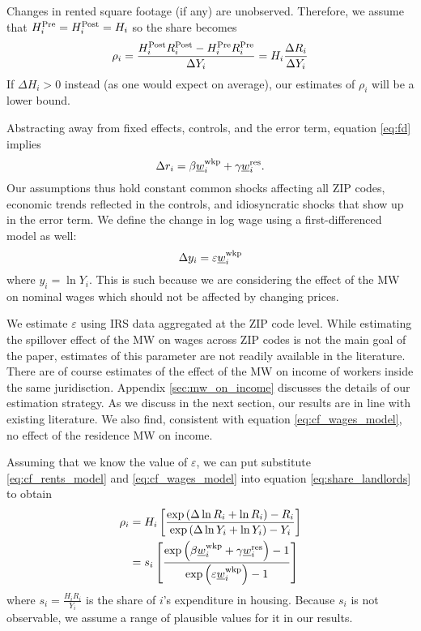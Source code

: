 Changes in rented square footage (if any) are unobserved.
Therefore, we assume that
$H^{\text{Pre}}_i = H^{\text{Post}}_i = H_i$ 
so the share becomes
\begin{equation}\label{eq:share_landlords}
    \rho_i = \frac{H^{\text{Post}}_i R^{\text{Post}}_i - H^{\text{Pre}}_i R^{\text{Pre}}_i}{\Delta Y_i} = 
                H_i \frac{\Delta R_i}{\Delta Y_i}
\end{equation}
If $\Delta H_i > 0$ instead (as one would expect on average), 
our estimates of $\rho_i$ will be a lower bound.

Abstracting away from fixed effects, controls, and the error term, 
equation \eqref{eq:fd} implies
\begin{equation}\label{eq:cf_rents_model}
    \Delta r_i = \beta \underline{w}_i^{\text{wkp}} + \gamma \underline{w}_i^{\text{res}} .
\end{equation}
Our assumptions thus hold 
constant common shocks affecting all ZIP codes,
economic trends reflected in the controls, and
idiosyncratic shocks that show up in the error term.
We define the change in log wage using a first-differenced model as well:
\begin{equation}\label{eq:cf_wages_model}
    \Delta y_i = \varepsilon \underline{w}_i^{\text{wkp}}
\end{equation}
where $y_i=\ln Y_i$.
This is such because we are considering the effect of the MW on nominal wages
which should not be affected by changing prices.

We estimate $\varepsilon$ using IRS data aggregated at the ZIP code level.
While estimating the spillover effect of the MW on wages across ZIP codes is 
not the main goal of the paper, 
estimates of this parameter are not readily available in the literature.
There are of course estimates of the effect of the MW on income of workers
inside the same juridisction.
Appendix \ref{sec:mw_on_income} discusses the details of our estimation 
strategy.
As we discuss in the next section, our results are in line with existing 
literature.
We also find, consistent with equation \eqref{eq:cf_wages_model}, no effect 
of the residence MW on income.

Assuming that we know the value of $\varepsilon$, we can put substitute
\eqref{eq:cf_rents_model} and \eqref{eq:cf_wages_model} into equation
\eqref{eq:share_landlords} to obtain
\begin{equation}\label{eq:rho}
    \begin{split}
        \rho_i & = H_i \left[ 
        \frac{\exp \left(\Delta \ln R_i + \ln R_i \right) - R_i }{\exp \left( \Delta \ln Y_i + \ln Y_i \right) - Y_i }
        \right] \\
        & = s_i \left[
            \frac{\exp \left( \beta \underline{w}_i^{\text{wkp}} + \gamma \underline{w}_i^{\text{res}} \right) - 1 }
                {\exp \left( \varepsilon \underline{w}_i^{\text{wkp}} \right) - 1 }
            \right]
    \end{split}
\end{equation}
where $s_i = \frac{H_i R_i}{Y_i}$ is the share of $i$'s expenditure in housing.
Because $s_i$ is not observable, we assume a range of plausible values for it
in our results.

